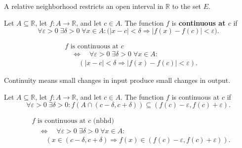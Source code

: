 \begin{remark*}[Interpretation]
A relative neighborhood restricts an open interval in $\mathbb{R}$
to the set $E$.
\end{remark*}


\begin{tcolorbox}[title={Definition --- Continuity at a Point}]
\begin{definition}
\label{def:continuous-at-point}
Let $A \subseteq \mathbb{R}$, let $f : A \to \mathbb{R}$, and let
$c \in A$. The function $f$ is \textbf{continuous at $c$} if
\[
\forall \varepsilon > 0 \;\exists \delta > 0 \;\forall x \in A :
\bigl(|x-c| < \delta \Rightarrow |f(x)-f(c)| < \varepsilon\bigr).
\]
\end{definition}
\end{tcolorbox}

\begin{remark*}
\[
\begin{aligned}
&f \text{ is continuous at } c \\
&\quad\Longleftrightarrow\quad
\forall \varepsilon > 0 \;\exists \delta > 0 \;\forall x \in A : \\
&\qquad (|x-c| < \delta \Rightarrow |f(x)-f(c)| < \varepsilon).
\end{aligned}
\]
\end{remark*}

\begin{remark*}[Interpretation]
Continuity means small changes in input produce small changes in output.
\end{remark*}


\begin{definition}
\label{def:continuous-at-point-nbhd}
Let $A \subseteq \mathbb{R}$, let $f : A \to \mathbb{R}$, and let
$c \in A$. The function $f$ is continuous at $c$ if
\[
\forall \varepsilon > 0 \;\exists \delta > 0 :
f(A \cap (c-\delta, c+\delta))
\subseteq (f(c)-\varepsilon, f(c)+\varepsilon).
\]
\end{definition}

\begin{remark*}
\[
\begin{aligned}
&f \text{ is continuous at } c \text{ (nbhd)} \\
&\quad\Longleftrightarrow\quad
\forall \varepsilon > 0 \;\exists \delta > 0 \;\forall x \in A : \\
&\qquad (x \in (c-\delta, c+\delta)
\Rightarrow f(x) \in (f(c)-\varepsilon, f(c)+\varepsilon)).
\end{aligned}
\]
\end{remark*}

